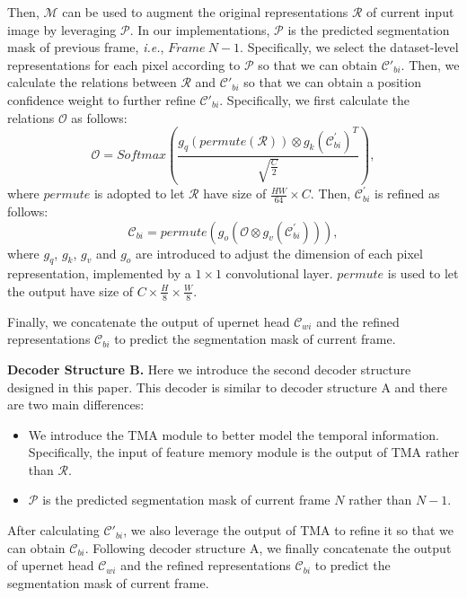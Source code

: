 \documentclass[10pt,twocolumn,letterpaper]{article}
\begin{document}
Then, $\mathcal{M}$ can be used to augment the original representations $\mathcal{R}$ of current input image by leveraging $\mathcal{P}$.
In our implementations, $\mathcal{P}$ is the predicted segmentation mask of previous frame, \emph{i.e.}, $Frame~N-1$.
Specifically, we select the dataset-level representations for each pixel according to $\mathcal{P}$ so that we can obtain $\mathcal{C}'_{bi}$.
Then, we calculate the relations between $\mathcal{R}$ and $\mathcal{C}'_{bi}$ so that we can obtain a position confidence weight to further refine $\mathcal{C}'_{bi}$.
Specifically, we first calculate the relations $\mathcal{O}$ as follows:
\begin{equation} \label{eq5}
   \mathcal{O} = Softmax(\frac{g_q(permute(\mathcal{R})) \otimes g_k(\mathcal{C}^{'}_{bi})^T}{\sqrt{\frac{C}{2}}}),
\end{equation}
where $permute$ is adopted to let $\mathcal{R}$ have size of $\frac{HW}{64} \times C$.
Then, $\mathcal{C}^{'}_{bi}$ is refined as follows:
\begin{equation} \label{eq6}
   \mathcal{C}_{bi} = permute(g_{o}(\mathcal{O} \otimes g_v(\mathcal{C}_{bi}^{'}))),
\end{equation}
where $g_q$, $g_k$, $g_v$ and $g_o$ are introduced to adjust the dimension of each pixel representation, implemented by a $1 \times 1$ convolutional layer.
$permute$ is used to let the output have size of $C \times \frac{H}{8} \times \frac{W}{8}$.

Finally, we concatenate the output of upernet head $\mathcal{C}_{wi}$ and the refined representations $\mathcal{C}_{bi}$ to predict the segmentation mask of current frame.


\noindent \textbf{Decoder Structure B.} 
Here we introduce the second decoder structure designed in this paper.
This decoder is similar to decoder structure A and there are two main differences:
\begin{itemize}
   \item We introduce the TMA module \cite{wang2021temporal} to better model the temporal information.
   Specifically, the input of feature memory module is the output of TMA rather than $\mathcal{R}$.

   \item $\mathcal{P}$ is the predicted segmentation mask of current frame $N$ rather than $N-1$.
\end{itemize}
After calculating $\mathcal{C}'_{bi}$, we also leverage the output of TMA to refine it so that we can obtain $\mathcal{C}_{bi}$.
Following decoder structure A, we finally concatenate the output of upernet head $\mathcal{C}_{wi}$ and the refined representations $\mathcal{C}_{bi}$ to predict the segmentation mask of current frame.
\end{document}
